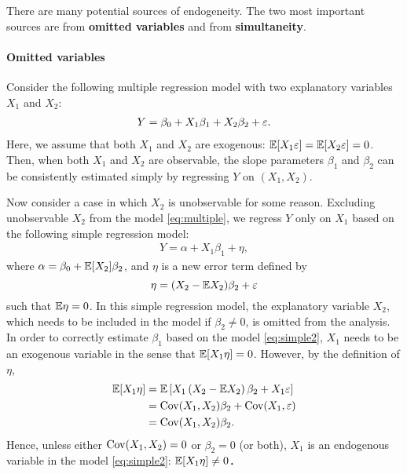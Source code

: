 \documentclass[11pt, A4paper, openany, uplatex]{book}
\begin{document}
There are many potential sources of endogeneity.
The two most important sources are from \textbf{omitted variables} and from \textbf{simultaneity}. 

\paragraph{Omitted variables}
Consider the following multiple regression model with two explanatory variables $X_1$ and $X_2$:
\begin{align}\label{eq:multiple}
Y = \beta_0 + X_1 \beta_1 + X_2 \beta_2 + \varepsilon.
\end{align}
Here, we assume that both $X_1$ and $X_2$ are exogenous: $\mathbb{E}[ X_1 \varepsilon ] = \mathbb{E} [ X_2 \varepsilon ] = 0$.
Then, when both $X_1$ and $X_2$ are observable, the slope parameters  $\beta_1$ and $\beta_2$ can be consistently estimated simply by regressing $Y$ on $(X_1, X_2)$.

Now consider a case in which $X_2$ is unobservable for some reason.
Excluding unobservable $X_2$ from the model \eqref{eq:multiple}, we regress $Y$ only on $X_1$ based on the following simple regression model:
\begin{align}\label{eq:simple2}
Y = \alpha +X_1 \beta_1 + \eta, 
\end{align}
where $\alpha = \beta_0 + \mathbb{E}[ X_2 ] \beta_2$, and $\eta$ is a new error term defined by
\[
\eta = ( X_2 - \mathbb{E} X_2  ) \beta_2 + \varepsilon
\]
such that $\mathbb{E}\eta = 0$.
In this simple regression model, the explanatory variable $X_2$, which needs to be included in the model if $\beta_{2}\neq 0$, is omitted from the analysis. 
In order to correctly estimate $\beta_1$ based on the model \eqref{eq:simple2}, $X_1$ needs to be an exogenous variable in the sense that	$\mathbb{E}[ X_1 \eta ]  = 0$.
However, by the definition of $\eta$,
\begin{align*}
	\mathbb{E}[  X_1 \eta ]   
	& = \mathbb{E}\left[  X_1 \left(  X_2 - \mathbb{E} X_2   \right) \beta_2 + X_1 \varepsilon \right] \\
	& = \mathrm{Cov}( X_1, X_2)  \beta_2 + \mathrm{Cov}( X_1, \varepsilon)\\
	& = \mathrm{Cov}( X_1, X_2)  \beta_2.
\end{align*}
Hence, unless either $\mathrm{Cov}( X_1, X_2 ) = 0$ or $\beta_2 = 0$ (or both), $X_1$ is an endogenous variable in the model \eqref{eq:simple2}: $\mathbb{E}[X_1 \eta] \neq 0$．
\end{document}

